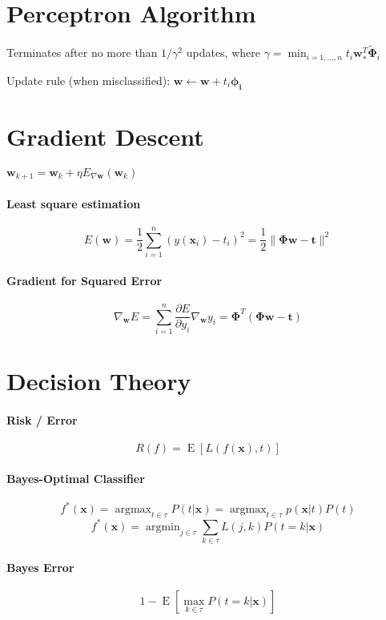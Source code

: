 \documentclass[9pt,fleqn]{scrartcl}
\DeclareMathOperator*{\argmax}{argmax}
\DeclareMathOperator*{\argmin}{argmin}
\DeclareMathOperator{\E}{E}
\begin{document}
\begin{multicols}{4}
\section{Perceptron Algorithm}
Terminates after no more than $1/\gamma^2$ updates, where 
$\gamma = \min_{i=1,\dots,n} t_i\mathbf{w}_*^T\mathbf{\tilde
\Phi}_i$

Update rule (when misclassified): $\mathbf{w} \leftarrow \mathbf{w} +
t_i\mathbf{\phi_i}$

\section{Gradient Descent}
$\mathbf{w}_{k+1} = \mathbf{w}_k + \eta E_{\nabla \mathbf w}(\mathbf{w}_k)$
\paragraph{Least square estimation}
\[ E(\mathbf w) = \frac12 \sum_{i=1}^n(y(\mathbf x_i)-t_i)^2= \frac12
\|\mathbf\Phi\mathbf w- \mathbf t\|^2 \]
\paragraph{Gradient for Squared Error}
\[ \nabla_{\mathbf w}E= \sum_{i=1}^n\frac{\partial E}{\partial y_i}
\nabla_{\mathbf w}y_i = \mathbf\Phi^T(\mathbf \Phi \mathbf w - \mathbf
t) \]

\section{Decision Theory}
\paragraph{Risk / Error}
\[ R(f) = \E \left [ L(f(\mathbf x), t) \right ] \]

\paragraph{Bayes-Optimal Classifier}
\[ f^*(\mathbf x) = \argmax_{t \in \tau} P(t|\mathbf x) = \argmax_{t
  \in \tau} p(\mathbf x|t) P(t) \]
\[ f^*(\mathbf x) = \argmin_{j \in \tau} \sum_{k \in \tau} L(j,k) P(t
= k | \mathbf x) \]
\paragraph{Bayes Error}
\[ 1 - \E \left [ \max_{k\in\tau} P(t = k | \mathbf x) \right ] \]

\end{multicols}
\end{document}

